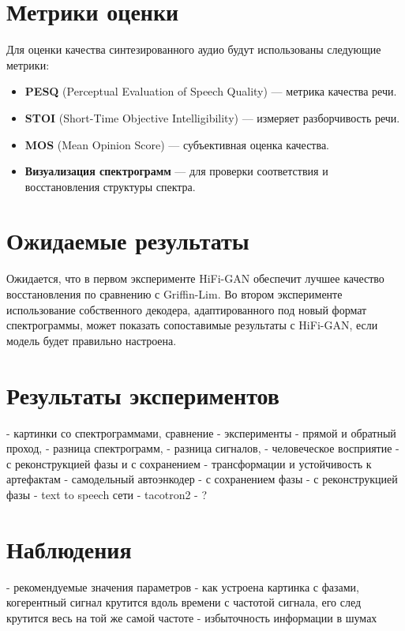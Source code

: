 \section{Метрики оценки}

Для оценки качества синтезированного аудио будут использованы следующие метрики:
\begin{itemize}
    \item \textbf{PESQ} (Perceptual Evaluation of Speech Quality) — метрика качества речи.
    \item \textbf{STOI} (Short-Time Objective Intelligibility) — измеряет разборчивость речи.
    \item \textbf{MOS} (Mean Opinion Score) — субъективная оценка качества.
    \item \textbf{Визуализация спектрограмм} — для проверки соответствия и восстановления структуры спектра.
\end{itemize}

\section{Ожидаемые результаты}

Ожидается, что в первом эксперименте HiFi-GAN обеспечит лучшее качество восстановления по сравнению с Griffin-Lim. Во втором эксперименте использование собственного декодера, адаптированного под новый формат спектрограммы, может показать сопоставимые результаты с HiFi-GAN, если модель будет правильно настроена.



















\section{Результаты экспериментов}
  - картинки со спектрограммами, сравнение
  - эксперименты
   - прямой и обратный проход, 
     - разница спектрограмм, 
     - разница сигналов, 
     - человеческое восприятие
     - с реконструкцией фазы и с сохранением
     - трансформации и устойчивость к артефактам
   - самодельный автоэнкодер 
     - с сохранением фазы
	 - с реконструкцией фазы
   - text to speech сети
     - tacotron2
	 - ?

\section{Наблюдения}
  - рекомендуемые значения параметров
  - как устроена картинка с фазами, когерентный сигнал крутится вдоль времени с частотой сигнала, его след крутится весь на той же самой частоте
  - избыточность информации в шумах

